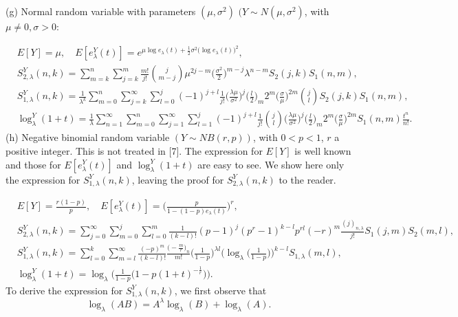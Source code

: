 \documentclass[a4paper,11pt]{amsart}
\begin{document}
(g) Normal random variable with parameters $(\mu, \sigma^{2})$ $(Y \sim N(\mu, \sigma^{2})$, with $\mu \ne 0, \sigma>0$: \par
\begin{align*}
&E[Y]=\mu,  \quad   E[e_{\lambda}^{Y}(t)]= e^{\mu\log e_{\lambda}(t)+\frac{1}{2}\sigma^{2}\big(\log e_{\lambda}(t)\big)^{2}}, \\
&S_{2,\lambda}^{Y}(n,k)=\sum_{m=k}^{n}\sum_{j=k}^{m}\frac{m!}{j!}\binom{j}{m-j}\mu^{2j-m}\Big(\frac{\sigma^{2}}{2}\Big)^{m-j}\lambda^{n-m}S_{2}(j,k)S_{1}(n,m),\\
&S_{1,\lambda}^{Y}(n,k)=\frac{1}{\lambda^{k}}\sum_{m=0}^{n}\sum_{j=k}^{\infty}\sum_{l=0}^{j}(-1)^{j+l}\frac{1}{j!}\Big(\frac{\lambda \mu}{\sigma^{2}} \Big )^{j}\Big(\frac{l}{2}\Big)_{m}2^{m}\Big(\frac{\sigma}{\mu} \Big)^{2m}\binom{j}{l}S_{2}(j,k) S_{1}(n,m),\\
&\log_{\lambda}^{Y}(1+t)
=\frac{1}{\lambda}\sum_{n=1}^{\infty}\sum_{m=0}^{n}\sum_{j=1}^{\infty}\sum_{l=1}^{j}(-1)^{j+l}\frac{1}{j!}\binom{j}{l}\Big(\frac{\lambda \mu}{\sigma^{2}}\Big)^{j}\Big(\frac{l}{2}\Big)_{m}2^{m}\Big(\frac{\sigma}{\mu}\Big)^{2m}S_{1}(n,m)\frac{t^{n}}{n!}.
\end{align*}
(h) Negative binomial random variable $(Y \sim NB(r,p))$, with $0<p<1$, $r$ a positive integer. This is not treated in [7]. The expression for $E[Y]$ is well known and those for $E[e_{\lambda}^{Y}(t)]$ and $\log_{\lambda}^{Y}(1+t)$ are  easy to see. We show here only the expression for $S_{1,\lambda}^{Y}(n,k)$, leaving the proof for $S_{2,\lambda}^{Y}(n,k)$ to the reader.\par
\begin{align*}
&E[Y]= \frac{r(1-p)}{p},  \quad   E[e_{\lambda}^{Y}(t)]= \bigg(\frac{p}{1-(1-p)e_{\lambda}(t)} \bigg)^{r},\\
&S_{2,\lambda}^{Y}(n,k)= \sum_{j=0}^{\infty}\sum_{m=0}^{j}\sum_{l=0}^{m}\frac{1}{(k-l)!}(p-1)^{j}(p^{r}-1)^{k-l}p^{rl}(-r)^{m}\frac{(j)_{n,\lambda}}{j!}S_{1}(j,m)S_{2}(m,l), \\
&S_{1,\lambda}^{Y}(n,k)= \sum_{l=0}^{k}\sum_{m=l}^{\infty}\frac{(-p)^{m}}{(k-l)!}\frac{\big(-\frac{m}{r}\big)_{n}}{m!}\Big(\frac{1}{1-p}\Big)^{\lambda l}\Big(\log_{\lambda}\Big(\frac{1}{1-p}\Big)\Big)^{k-l}S_{1,\lambda}(m,l),\\
&\log_{\lambda}^{Y}(1+t)=\log_{\lambda}\Big(\frac{1}{1-p}\big(1-p(1+t)^{-\frac{1}{r}} \big)\Big).
\end{align*}
 To derive the expression for $S_{1,\lambda}^{Y}(n,k)$, we first observe that 
\begin{equation*}
\log_{\lambda}(AB)=A^{\lambda}\log_{\lambda}(B)+\log_{\lambda}(A).
\end{equation*}
\end{document}
